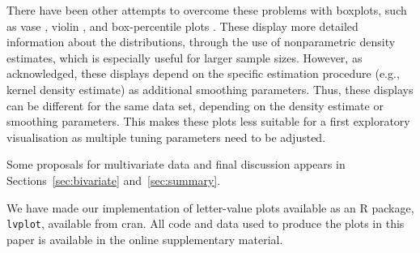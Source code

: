 \documentclass[oneside]{article}
\begin{document}


There have been other attempts to overcome these problems with boxplots, such as vase \citep{vase}, violin \citep{violin}, and box-percentile plots \citep{box.percentiles}. These display more detailed information about the distributions, through the use of nonparametric density estimates, which is especially useful for larger sample sizes. However, as \citet{vase} acknowledged, these displays depend on the specific estimation procedure (e.g., kernel density estimate) as additional smoothing parameters. Thus, these displays can be different for the same data set, depending on the density estimate or smoothing parameters. This makes these plots less suitable for a first exploratory visualisation as multiple tuning parameters need to be adjusted.

Some proposals for multivariate data and final discussion appears in Sections~\ref{sec:bivariate} and~\ref{sec:summary}.

We have made our implementation of letter-value plots available as an R package, \texttt{lvplot}, available from {\sc cran}. All code and data used to produce the plots in this paper is available in the online supplementary material.
\end{document}
